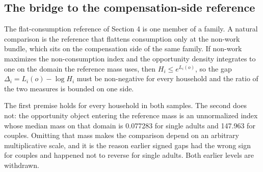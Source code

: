 \subsection{The bridge to the compensation-side reference}\label{the-bridge-to-the-compensation-side-reference}

The flat-consumption reference of Section 4 is one member of a family. A natural comparison is the reference that flattens consumption only at the non-work bundle, which sits on the compensation side of the same family. If non-work maximizes the non-consumption index and the opportunity density integrates to one on the domain the reference mass uses, then \(H_i\le e^{L_i(o)}\), so the gap \(\Delta_i=L_i(o)-\log H_i\) must be non-negative for every household and the ratio of the two measures is bounded on one side.

The first premise holds for every household in both samples. The second does not: the opportunity object entering the reference mass is an unnormalized index whose median mass on that domain is 0.077283 for single adults and 147.963 for couples. Omitting that mass makes the comparison depend on an arbitrary multiplicative scale, and it is the reason earlier signed gaps had the wrong sign for couples and happened not to reverse for single adults. Both earlier levels are withdrawn.

